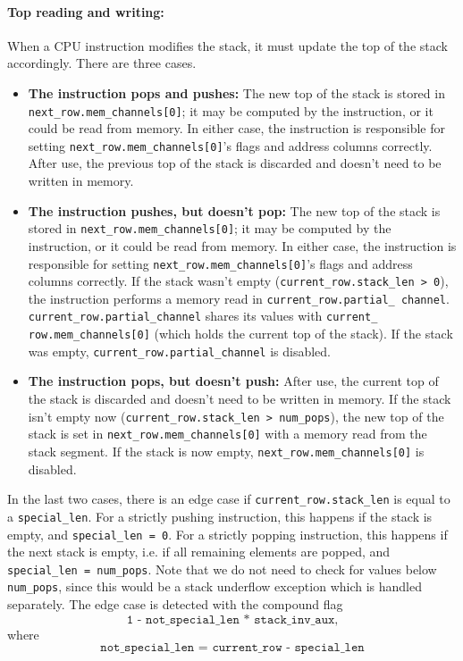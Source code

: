 \paragraph*{Top reading and writing:}

When a CPU instruction modifies the stack, it must update the top of the stack accordingly. There are three cases.

\begin{itemize}
  \item \textbf{The instruction pops and pushes:} The new top of the stack is stored in \texttt{next\_row.mem\_channels[0]}; it may be computed by the instruction,
or it could be read from memory. In either case, the instruction is responsible for setting \texttt{next\_row.mem\_channels[0]}'s flags and address columns correctly.
After use, the previous top of the stack is discarded and doesn't need to be written in memory.
  \item \textbf{The instruction pushes, but doesn't pop:} The new top of the stack is stored in \texttt{next\_row.mem\_channels[0]}; it may be computed by the instruction,
or it could be read from memory. In either case, the instruction is responsible for setting \texttt{next\_row.mem\_channels[0]}'s flags and address columns correctly.
If the stack wasn't empty (\texttt{current\_row.stack\_len > 0}), the instruction performs a memory read in \texttt{current\_row.partial\_ channel}. \texttt{current\_row.partial\_channel}
shares its values with \texttt{current\_ row.mem\_channels[0]} (which holds the current top of the stack). If the stack was empty, \texttt{current\_row.partial\_channel}
is disabled.
  \item \textbf{The instruction pops, but doesn't push:} After use, the current top of the stack is discarded and doesn't need to be written in memory.
If the stack isn't empty now (\texttt{current\_row.stack\_len > num\_pops}), the new top of the stack is set in \texttt{next\_row.mem\_channels[0]}
with a memory read from the stack segment. If the stack is now empty, \texttt{next\_row.mem\_channels[0]} is disabled.
\end{itemize}

In the last two cases, there is an edge case if \texttt{current\_row.stack\_len} is equal to a \texttt{special\_len}. For a strictly pushing instruction,
this happens if the stack is empty, and \texttt{special\_len = 0}. For a strictly popping instruction, this happens if the next stack is empty, i.e. if
all remaining elements are popped, and \texttt{special\_len = num\_pops}. Note that we do not need to check for values below \texttt{num\_pops}, since this
would be a stack underflow exception which is handled separately.
The edge case is detected with the compound flag
$$\texttt{1 - not\_special\_len * stack\_inv\_aux,}$$
where $$\texttt{not\_special\_len = current\_row - special\_len}$$


